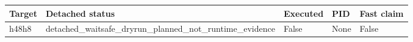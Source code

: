 {\small
\begin{tabular}{lllll}
\hline
Target & Detached status & Executed & PID & Fast claim \\
\hline
h48h8 & detached\_waitsafe\_dryrun\_planned\_not\_runtime\_evidence & False & None & False \\
\hline
\end{tabular}
}

